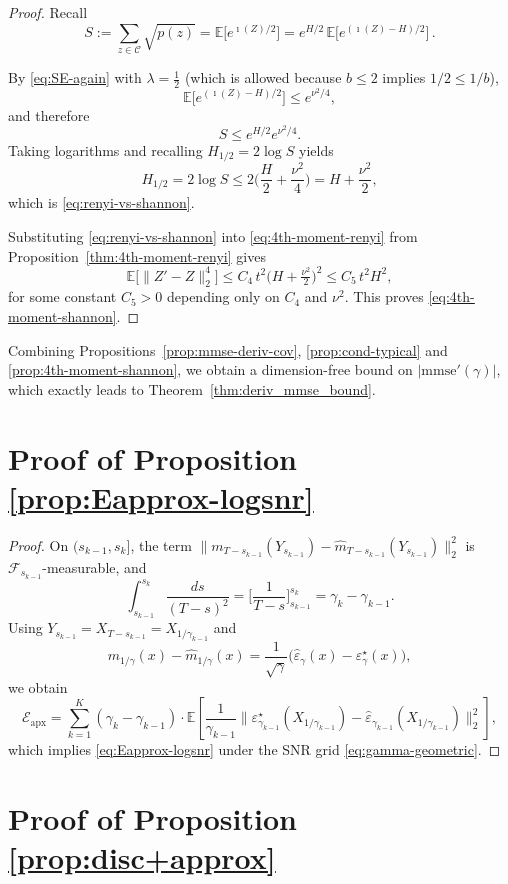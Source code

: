 \documentclass[11pt]{article}
\newcommand{\info}{\imath}         %
\theoremstyle{definition}
\newcommand{\E}{\mathbb{E}}
\numberwithin{equation}{section}
\begin{document}
\begin{proof}
Recall
\[
S := \sum_{z\in\mathcal C}\sqrt{p(z)}
= \mathbb E\big[e^{\info(Z)/2}\big]
= e^{H/2}\,\mathbb E\big[e^{(\info(Z)-H)/2}\big]\,.
\]

By \eqref{eq:SE-again} with $\lambda=\tfrac12$ (which is allowed
because $b\le 2$ implies $1/2\le 1/b$),
\[
\mathbb E\big[e^{(\info(Z)-H)/2}\big]
\le e^{\nu^2/4},
\]
and therefore
\[
S \le e^{H/2} e^{\nu^2/4}.
\]
Taking logarithms and recalling
$H_{1/2}=2\log S$ yields
\[
H_{1/2}
= 2\log S
\le 2\Big(\frac{H}{2} + \frac{\nu^2}{4}\Big)
= H + \frac{\nu^2}{2},
\]
which is \eqref{eq:renyi-vs-shannon}.

Substituting \eqref{eq:renyi-vs-shannon} into
\eqref{eq:4th-moment-renyi} from Proposition~\ref{thm:4th-moment-renyi}
gives
\[
\mathbb E\big[\|Z'-Z\|_2^4\big]
\le C_4\,t^2 \bigl(H+\tfrac{\nu^2}{2}\bigr)^2
\le C_5\,t^2 H^2,
\]
for some constant $C_5>0$ depending only on $C_4$ and $\nu^2$.
This proves \eqref{eq:4th-moment-shannon}.
\end{proof}

Combining Propositions~\ref{prop:mmse-deriv-cov}, \ref{prop:cond-typical} and \ref{prop:4th-moment-shannon}, we obtain a dimension-free bound on $|\mathrm{mmse}'(\gamma)|$, which exactly leads to Theorem~\ref{thm:deriv_mmse_bound}.
\section{Proof of Proposition~ \ref{prop:Eapprox-logsnr}}

\begin{proof}
On $(s_{k-1},s_k]$, the term
$\bigl\|m_{T-s_{k-1}}(Y_{s_{k-1}})-\hat m_{T-s_{k-1}}(Y_{s_{k-1}})\bigr\|_2^2$
is $\mathcal F_{s_{k-1}}$-measurable, and
\[
\int_{s_{k-1}}^{s_k}\frac{ds}{(T-s)^2}
=
\Big[\frac{1}{T-s}\Big]_{s_{k-1}}^{s_k}
=
\gamma_k-\gamma_{k-1}.
\]
Using $Y_{s_{k-1}}=X_{T-s_{k-1}}=X_{1/\gamma_{k-1}}$ and
\[
m_{1/\gamma}(x)-\hat m_{1/\gamma}(x)
=
\frac{1}{\sqrt{\gamma}}\bigl(\hat\varepsilon_\gamma(x)-\varepsilon_\gamma^\star(x)\bigr),
\]
we obtain
\[
\mathcal E_{\mathrm{apx}}
=
\sum_{k=1}^K
(\gamma_k-\gamma_{k-1})\cdot
\E\!\left[\frac{1}{\gamma_{k-1}}
\big\|\varepsilon_{\gamma_{k-1}}^\star(X_{1/\gamma_{k-1}})
-\hat\varepsilon_{\gamma_{k-1}}(X_{1/\gamma_{k-1}})\big\|_2^2\right],
\]
which implies \eqref{eq:Eapprox-logsnr} under the SNR grid \eqref{eq:gamma-geometric}.
\end{proof}

\section{Proof of Proposition~ \ref{prop:disc+approx}}
\end{document}
